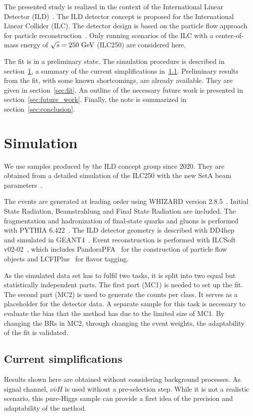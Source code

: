 \documentclass[11pt, hidelinks, a4paper]{scrartcl}
\newcommand{\eV}{\text{e\kern-0.15ex V}\xspace}
\newcommand{\GeV}{\text{G\eV}\xspace}
\begin{document}
The presented study is realized in the context of the
International Linear Detector (ILD)~\cite{ILD_DBD,ILD_IDR}.
The ILD detector concept is proposed for the International Linear Collider (ILC).
The detector design is based on the particle flow approach
for particle reconstruction~\cite{ParticleFlow}.
Only running scenarios of the ILC
with a center-of-mass energy of $\sqrt{s}=250~\GeV$ (ILC250)
are considered here.

The fit is in a preliminary state.
The simulation procedure is described in section~\ref{sec:simulation},
a summary of the
current simplifications in~\ref{subsec:simplifications}.
Preliminary results from the fit,
with some known shortcomings, are already available.
They are given in section~\ref{sec:fit}.
An outline of the necessary future work is presented
in section~\ref{sec:future_work}.
Finally, the note is summarized in section~\ref{sec:conclusion}.

\section{Simulation}\label{sec:simulation}
We use samples produced by the ILD concept group since 2020.
They are obtained from a detailed simulation of the ILC250
with the new SetA beam parameters~\cite{ILC_Staging_2017}.

The events are generated at leading order using
WHIZARD version 2.8.5~\cite{whizard,omega}.
Initial State Radiation, Beamstrahlung and Final State Radiation are included.
The fragmentation and hadronization of final-state quarks and gluons
is performed with PYTHIA 6.422~\cite{pythia}.
The ILD detector geometry is described with DD4hep~\cite{DD4hep}
and simulated in GEANT4~\cite{GEANT4}.
Event reconstruction is performed with ILCSoft v02-02~\cite{ILCSoft},
which includes PandoraPFA~\cite{PandoraPFA} for
the construction of particle flow objects
and LCFIPlus~\cite{LCFIPlus} for flavor tagging.

As the simulated data set has to fulfil two tasks,
it is split into two equal but statistically independent parts.
The first part (MC1) is needed to set up the fit.
The second part (MC2) is used to generate the counts per class.
It serves as a placeholder for the detector data.
A separate sample for this task is necessary
to evaluate the bias
that the method has due to the limited size of MC1.
By changing the BRs in MC2, through changing the event weights,
the adaptability of the fit is validated.

\subsection{Current simplifications}\label{subsec:simplifications}
Results shown here are obtained without considering background processes.
As signal channel, $\nu \bar{\nu} H$ is used without a pre-selection step.
While it is not a realistic scenario,
this pure-Higgs sample can provide a first idea
of the precision and adaptability of the method.
\end{document}
